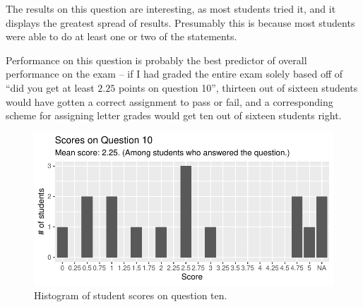 \documentclass[nobib]{tufte-handout}
\begin{document}
The results on this question are interesting, as most students tried it, and it displays the greatest spread of results. Presumably this is because most students were able to do at least one or two of the statements. 

Performance on this question is probably the best predictor of overall performance on the exam -- if I had graded the entire exam solely based off of ``did you get at least $2.25$ points on question 10'', thirteen out of sixteen students would have gotten a correct assignment to pass or fail, and a corresponding scheme for assigning letter grades would get ten out of sixteen students right.

\begin{figure}
  \centering
  \includegraphics[width = \textwidth]{Q10.pdf}
  \caption[Score histogram for Q10]{Histogram of student scores on question ten.}
  \label{fig:Q10}
\end{figure}
\end{document}
